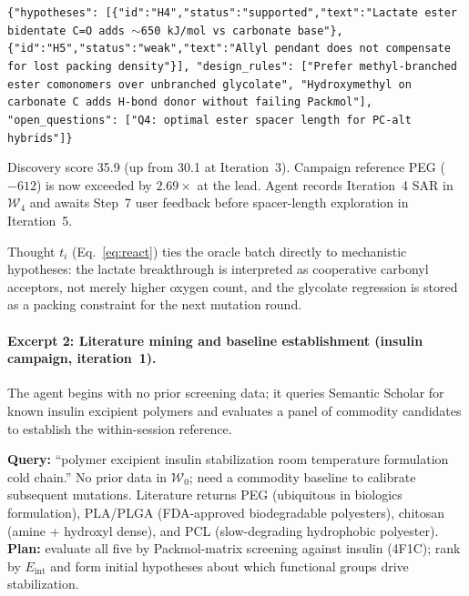 \documentclass[twocolumn]{fairmeta}
\begin{document}
\begin{toolcall}
\scriptsize
\texttt{\{"hypotheses": [\{"id":"H4","status":"supported","text":"Lactate ester bidentate C=O adds $\sim$650 kJ/mol vs carbonate base"\}, \{"id":"H5","status":"weak","text":"Allyl pendant does not compensate for lost packing density"\}], "design\_rules": ["Prefer methyl-branched ester comonomers over unbranched glycolate", "Hydroxymethyl on carbonate C adds H-bond donor without failing Packmol"], "open\_questions": ["Q4: optimal ester spacer length for PC-alt hybrids"]\}}
\end{toolcall}

\begin{observation}
\scriptsize
Discovery score 35.9 (up from 30.1 at Iteration~3).
Campaign reference PEG ($-612$) is now exceeded by $2.69\times$ at the lead.
Agent records Iteration~4 SAR in $\mathcal{W}_4$ and awaits Step~7 user feedback before spacer-length exploration in Iteration~5.
\end{observation}

\noindent Thought $t_i$ (Eq.~\ref{eq:react}) ties the oracle batch directly to mechanistic hypotheses: the lactate breakthrough is interpreted as cooperative carbonyl acceptors, not merely higher oxygen count, and the glycolate regression is stored as a packing constraint for the next mutation round.

\paragraph{Excerpt 2: Literature mining and baseline establishment (insulin campaign, iteration~1).}
The agent begins with no prior screening data; it queries Semantic Scholar for known insulin excipient polymers and evaluates a panel of commodity candidates to establish the within-session reference.

\begin{agentthought}
\scriptsize
\textbf{Query:} ``polymer excipient insulin stabilization room temperature formulation cold chain.''
No prior data in $\mathcal{W}_0$; need a commodity baseline to calibrate subsequent mutations.
Literature returns PEG (ubiquitous in biologics formulation), PLA/PLGA (FDA-approved biodegradable polyesters), chitosan (amine + hydroxyl dense), and PCL (slow-degrading hydrophobic polyester).
\textbf{Plan:} evaluate all five by Packmol-matrix screening against insulin (4F1C); rank by $E_\text{int}$ and form initial hypotheses about which functional groups drive stabilization.
\end{agentthought}
\end{document}
